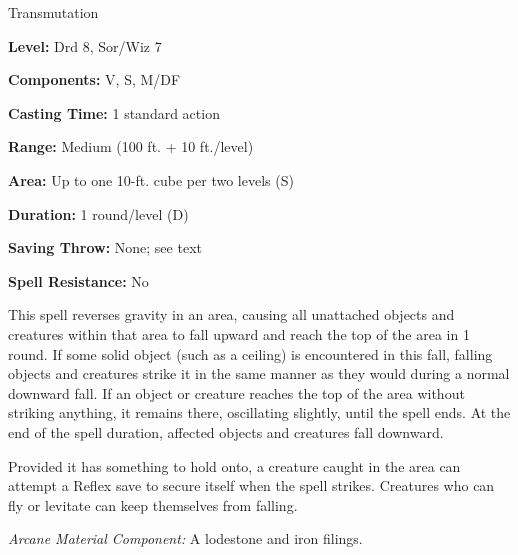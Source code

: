 
Transmutation

\textbf{Level:} Drd 8, Sor/Wiz 7

\textbf{Components:} V, S, M/DF

\textbf{Casting Time:} 1 standard action

\textbf{Range:} Medium (100 ft. + 10 ft./level)

\textbf{Area:} Up to one 10-ft. cube per two levels (S)

\textbf{Duration:} 1 round/level (D)

\textbf{Saving Throw:} None; see text

\textbf{Spell Resistance:} No

This spell reverses gravity in an area, causing all unattached objects and creatures 
within that area to fall upward and reach the top of the area in 1 round. If some 
solid object (such as a ceiling) is encountered in this fall, falling objects and 
creatures strike it in the same manner as they would during a normal downward fall. 
If an object or creature reaches the top of the area without striking anything, 
it remains there, oscillating slightly, until the spell ends. At the end of the 
spell duration, affected objects and creatures fall downward.

Provided it has something to hold onto, a creature caught in the area can attempt 
a Reflex save to secure itself when the spell strikes. Creatures who can fly or 
levitate can keep themselves from falling.

\textit{Arcane Material Component:} A lodestone and iron filings.

